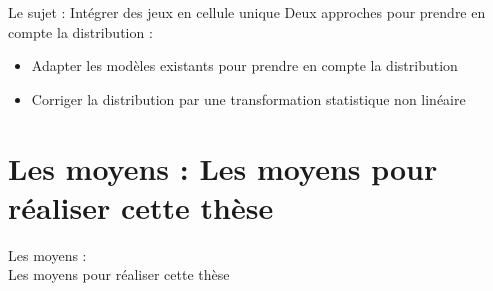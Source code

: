 \documentclass[10pt]{beamer}
\begin{document}
\begin{frame}{Le sujet : Intégrer des jeux en cellule unique }
    Deux approches pour prendre en compte la distribution : 
    \begin{itemize}
        \item Adapter les modèles existants pour prendre en compte la distribution
        \item Corriger la distribution par une transformation statistique non linéaire 
    \end{itemize}
\end{frame}

\section{Les moyens : Les moyens pour réaliser cette thèse}
\begin{frame}{}
    \begin{center}
        {\Huge Les moyens : }\\
        \vfill
        {\LARGE Les moyens pour réaliser cette thèse}
    \end{center}
\end{frame}
\end{document}
